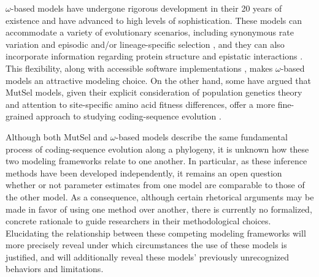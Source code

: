 \documentclass[11pt]{article}
\begin{document}
$\omega$-based models have undergone rigorous development in their 20 years of existence and have advanced to high levels of sophistication. These models can accommodate a variety of evolutionary scenarios, including synonymous rate variation \cite{MuseGaut1994,KosakovskyPondMuse2005} and episodic \cite{KosakovskyPondetal2011,MEME} and/or lineage-specific selection \cite{YangNielsen2002,Zhangetal2005,KosakovskyPondFrost2005a}, and they can also incorporate information regarding protein structure and epistatic interactions \cite{Robinsonetal2003,Thorneetal2007,Rodrigueetal2009,Scherreretal2012,MeyerWilke2012}. This flexibility, along with accessible software implementations \cite{KosakovskyPondetal2005,Yang2007,Delport2010}, makes $\omega$-based models an attractive modeling choice. On the other hand, some have argued that MutSel models, given their explicit consideration of population genetics theory and attention to site-specific amino acid fitness differences, offer a more fine-grained approach to studying coding-sequence evolution \cite{HalpernBruno1998,Rodrigueetal2010,Tamurietal2012,Thorne2012}. 
		
Although both MutSel and $\omega$-based models describe the same fundamental process of coding-sequence evolution along a phylogeny, it is unknown how these two modeling frameworks relate to one another. In particular, as these inference methods have been developed independently, it remains an open question whether or not parameter estimates from one model are comparable to those of the other model. As a consequence, although certain rhetorical arguments may be made in favor of using one method over another, there is currently no formalized, concrete rationale to guide researchers in their methodological choices. Elucidating the relationship between these competing modeling frameworks will more precisely reveal under which circumstances the use of these models is justified, and will additionally reveal these models' previously unrecognized behaviors and limitations.
		
\end{document}
